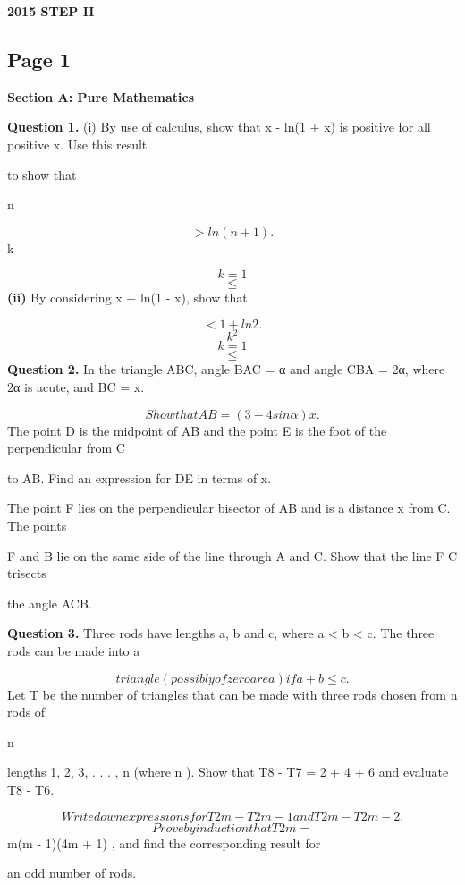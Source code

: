 \documentclass[12pt]{article}
\begin{document}
\begin{center}
{\Large \textbf{2015 STEP II}}
\end{center}

\subsection*{Page 1}
\begin{flushleft}
\bigskip\textbf{Section A: Pure Mathematics}\par
\bigskip\textbf{Question 1.} (i) By use of calculus, show that x - ln(1 + x) is positive for all positive x. Use this result\par
to show that\par
n\par
\[> ln(n + 1) .\]
k\par
\[k=1\]
\[\leq\]
\textbf{(ii)} By considering x + ln(1 - x), show that\par
\infty\par
\[< 1 + ln 2 .\]
\[k^2\]
\[k=1\]
\[\leq\]
\bigskip\textbf{Question 2.} In the triangle ABC, angle BAC = α and angle CBA = 2α, where 2α is acute, and BC = x.\par
\[Show that AB = (3 - 4 sin α)x.\]
The point D is the midpoint of AB and the point E is the foot of the perpendicular from C\par
to AB. Find an expression for DE in terms of x.\par
The point F lies on the perpendicular bisector of AB and is a distance x from C. The points\par
F and B lie on the same side of the line through A and C. Show that the line F C trisects\par
the angle ACB.\par
\bigskip\textbf{Question 3.} Three rods have lengths a, b and c, where a < b < c. The three rods can be made into a\par
\[triangle (possibly of zero area) if a + b \leq c.\]
Let T be the number of triangles that can be made with three rods chosen from n rods of\par
n\par
lengths 1, 2, 3, . . . , n (where n ). Show that T8 - T7 = 2 + 4 + 6 and evaluate T8 - T6.\par
\[Write down expressions for T2m - T2m-1 and T2m - T2m-2.\]
\[Prove by induction that T2m =\]
m(m - 1)(4m + 1) , and find the corresponding result for\par
an odd number of rods.\par
\end{flushleft}
\end{document}
